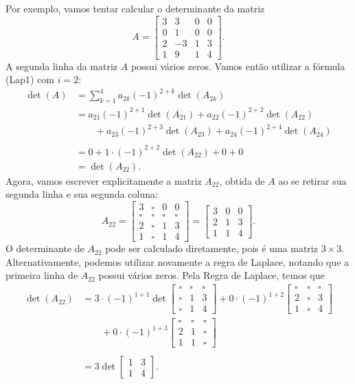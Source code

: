 Por exemplo, vamos tentar calcular o determinante da matriz
\[A=\begin{bmatrix}
3 & 3 & 0 & 0\\
0 & 1 & 0 & 0\\
2 & -3 & 1 & 3\\
1 & 9 & 1 & 4
\end{bmatrix}.\]
A segunda linha da matriz $A$ possui vários zeros. Vamos então utilizar a fórmula (Lap1) com $i=2$:
\begin{align*}
\det(A)
	&=\sum_{k=1}^4a_{2k}(-1)^{2+k}\det(A_{2k})\\
	&=a_{21}(-1)^{2+1}\det(A_{21})+a_{22}(-1)^{2+2}\det(A_{22})\\
	&\qquad+a_{23}(-1)^{2+3}\det(A_{23})+a_{24}(-1)^{2+4}\det(A_{24})\\ \\
	&=0+1\cdot(-1)^{2+2}\det(A_{22})+0+0\\
	&=\det(A_{22}).
\end{align*}
Agora, vamos escrever explicitamente a matriz $A_{22}$, obtida de $A$ ao se retirar sua segunda linha e sua segunda coluna:
\[A_{22}=\begin{bmatrix}
3 & \square & 0 & 0\\
\square & \square & \square & \square\\
2 & \square & 1 & 3\\
1 & \square & 1 & 4
\end{bmatrix}=\begin{bmatrix}
3 & 0 & 0\\
2 & 1 & 3\\
1 & 1 & 4
\end{bmatrix}.\]
O determinante de $A_{22}$ pode ser calculado diretamente, pois é uma matriz $3\times 3$. Alternativamente, podemos utilizar novamente a regra de Laplace, notando que a primeira linha de $A_{22}$ possui vários zeros. Pela Regra de Laplace, temos que
\begin{align*}
\det(A_{22})
	&=3\cdot (-1)^{1+1}\det\begin{bmatrix}
\square & \square & \square\\
\square & 1 & 3\\
\square & 1 & 4
\end{bmatrix}+0\cdot (-1)^{1+2}\begin{bmatrix}
\square & \square & \square\\
2 & \square & 3\\
1 & \square & 4
\end{bmatrix}\\
&\qquad+0\cdot (-1)^{1+3}\begin{bmatrix}
\square & \square & \square\\
2 & 1 & \square\\
1 & 1 & \square
\end{bmatrix}\\ \\
&=3\det\begin{bmatrix}1 & 3\\
1 & 4\end{bmatrix}.
\end{align*}
